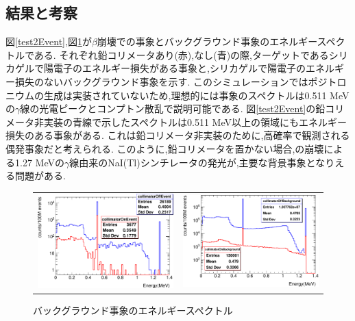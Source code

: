 \subsection{結果と考察}

図\ref{test2Event},図\ref{test2Back}が$\beta$崩壊での事象とバックグラウンド事象のエネルギースペクトルである.
それぞれ鉛コリメータあり(赤),なし(青)の際,ターゲットであるシリカゲルで陽電子のエネルギー損失がある事象と,シリカゲルで陽電子のエネルギー損失のないバックグラウンド事象を示す.
このシミュレーションではポジトロニウムの生成は実装されていないため,理想的には事象のスペクトルは0.511 MeVの$\gamma$線の光電ピークとコンプトン散乱で説明可能である.
図\ref{test2Event}の鉛コリメータ非実装の青線で示したスペクトルは0.511 MeV以上の領域にもエネルギー損失のある事象がある.
これは鉛コリメータ非実装のために,高確率で観測される偶発事象だと考えられる.
このように,鉛コリメータを置かない場合,の崩壊による1.27 MeVの$\gamma$線由来のNaI(Tl)シンチレータの発光が,主要な背景事象となりえる問題がある.

\begin{figure}[!tbp]
	\begin{tabular}{cc}
	\centering
		\begin{minipage}{0.5\hsize}
		\includegraphics[width=7cm]{fig/test2Event.pdf}
			\caption{鉛コリメータの有無で期待される事象のエネルギースペクトル}
	\label{test2Event}
		\end{minipage}&

		\begin{minipage}{0.5\hsize}
	\centering
		\includegraphics[width=7cm]{fig/test2Back.pdf}
			\caption{バックグラウンド事象のエネルギースペクトル}
	\label{test2Back}
		\end{minipage}
		\end{tabular}
\end{figure}

